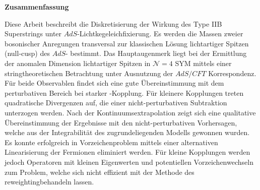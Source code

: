 %
\begin{center}
{\sffamily \bfseries\Large Zusammenfassung}\\
\end{center}%
\vspace{1cm}
%
Diese Arbeit beschreibt die Diskretisierung der Wirkung des Type IIB  Superstrings unter $AdS$-Lichtkegeleichfixierung. Es werden die Massen zweier bosonischer Anregungen transversal zur klassischen Lösung lichtartiger Spitzen (null-cusp) des $AdS$- bestimmt. Das Hauptaugenmerk liegt bei der Ermittlung der anomalen Dimension lichtartiger Spitzen in $\mathcal{N}=4$ SYM mittels einer stringtheoretischen Betrachtung unter Ausnutzung der \linebreak $AdS/CFT$ Korrespondenz. Für beide Observablen findet sich eine gute Übereinstimmung mit dem perturbativen Bereich bei starker -Kopplung. Für kleinere Kopplungen treten quadratische Divergenzen auf, die einer nicht-perturbativen Subtraktion unterzogen werden. Nach der Kontinuumsextrapolation zeigt sich eine qualitative Übereinstimmung der Ergebnisse mit den nicht-perturbativen Vorhersagen, welche aus der Integrabilität des zugrundeliegenden Modells gewonnen wurden. Es konnte erfolgreich in Vorzeichenproblem mittels einer alternativen Linearisierung der Fermionen eliminiert werden. Für kleine Kopplungen werden jedoch Operatoren mit kleinen Eigenwerten und potentiellen Vorzeichenwechseln zum Problem, welche sich nicht effizient mit der Methode des \glqq reweighting\grqq{ }behandeln lassen.
